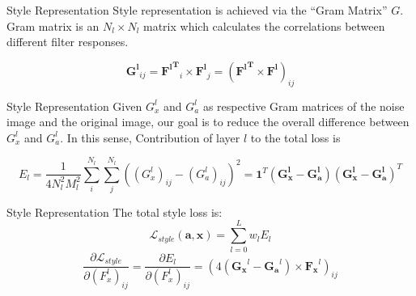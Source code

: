 \documentclass{beamer}
\begin{document}
\begin{frame}{Style Representation}
Style representation is achieved via the ``Gram Matrix'' $G$. Gram matrix is
an $N_l \times N_l$ matrix which calculates the correlations between
different filter responses.

\begin{equation}
    \mathbf{G^l}_{ij} = \mathbf{{F^l}^T}_i \times \mathbf{F^l}_j
    = (\mathbf{{F^l}^T} \times \mathbf{F^l})_{ij}
\end{equation}
\end{frame}



\begin{frame}{Style Representation}
Given $G_x^l$ and $G_a^l$ as respective Gram matrices of the noise image and
the original image, our goal is to reduce the overall difference between
$G_x^l$ and $G_a^l$. In this sense, Contribution of layer $l$ to the total
loss is

\begin{equation}
    E_l = \frac{1}{4N_l^2M_l^2} \sum_{i}^{N_l}\sum_{j}^{N_l}{((G^l_x)_{ij} - (G_a^l)_{ij})^2}
    = \mathbf{1}^T(\mathbf{G^l_x} - \mathbf{G^l_a})(\mathbf{G^l_x} - \mathbf{G^l_a})^T
\end{equation}

\end{frame}



\begin{frame}{Style Representation}
The total style loss is:
\begin{equation}
    \mathcal{L}_{style}(\mathbf{a}, \mathbf{x}) = \sum_{l=0}^L {w_l E_l }
\end{equation}
\begin{equation}
    \frac{\partial \mathcal{L}_{style}}{\partial (F_x^l)_{ij}} = \frac{\partial E_l}{\partial (F^l_x)_{ij}} =
    (4(\mathbf{G_x}^l - \mathbf{G_a}^l) \times \mathbf{F_x}^l)_{ij}
\end{equation}
\end{frame}
\end{document}
